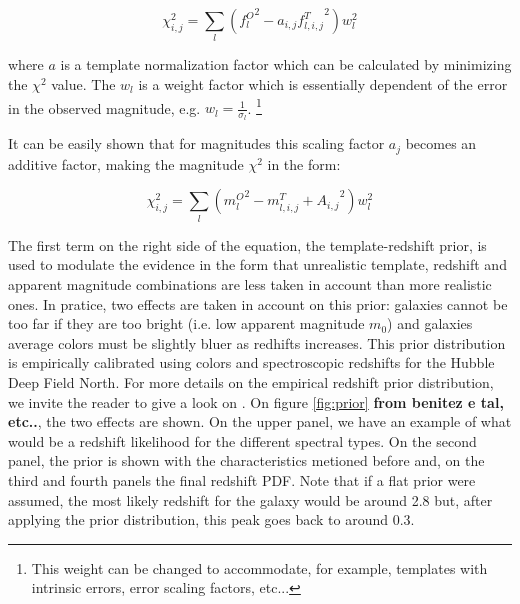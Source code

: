 \documentclass[9pt]{memoir}
\begin{document}
\begin{equation}
\chi^2_{i,j} = \sum_l \left( {f^O_l}^2 - a_{i,j} {f^T_{l,i,j}}^2 \right) w^2_l
\end{equation}

where $a$ is a template normalization factor which can be calculated by minimizing the $\chi^2$ value. The $w_l$ is a weight factor which is essentially dependent of the error in the observed magnitude, e.g. $w_l = \frac{1}{\sigma_l}$. \footnote{This weight can be changed to accommodate, for example, templates with intrinsic errors, error scaling factors, etc...}

It can be easily shown that for magnitudes this scaling factor $a_j$ becomes an additive factor, making the magnitude $\chi^2$ in the form:

\begin{equation}
\chi^2_{i,j} = \sum_l \left( {m^O_l}^2 - {m^T_{l,i,j} + A_{i,j}}^2 \right) w^2_l
\end{equation}

The first term on the right side of the equation, the template-redshift prior, is used to modulate the evidence in the form that unrealistic template, redshift and apparent magnitude combinations are less taken in account than more realistic ones. In pratice, two effects are taken in account on this prior: galaxies cannot be too far if they are too bright (i.e. low apparent magnitude $m_0$) and galaxies average colors must be slightly bluer as redhifts increases. This prior distribution is empirically calibrated using colors and spectroscopic redshifts for the Hubble Deep Field North. For more details on the empirical redshift prior distribution, we invite the reader to give a look on \cite{Benitez.2000a}. On figure \ref{fig:prior} \textbf{from benitez e tal, etc..}, the two effects are shown. On the upper panel, we have an example of what would be a redshift likelihood for the different spectral types. On the second panel, the prior is shown with the characteristics metioned before and, on the third and fourth panels the final redshift PDF. Note that if a flat prior were assumed, the most likely redshift for the galaxy would be around 2.8 but, after applying the prior distribution, this peak goes back to around 0.3.
\end{document}
